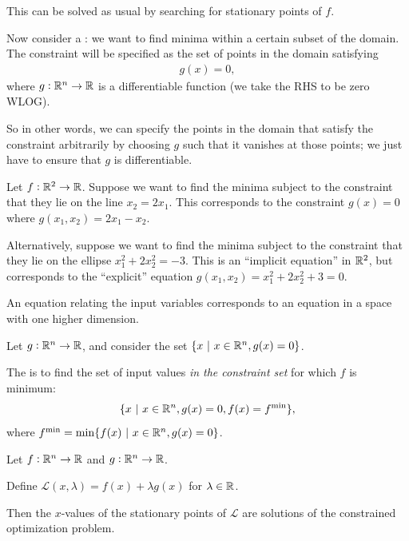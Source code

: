 This can be solved as usual by searching for stationary points of $f$.

Now consider a : we want to find minima within a certain
subset of the domain. The constraint will be specified as the set of points in the domain satisfying
\begin{align*}
  g(x) = 0,
\end{align*}
where $g:\mathbb{R}^n \to \mathbb{R}$ is a differentiable function (we take the RHS to be zero WLOG).

So in other words, we can specify the points in the domain that satisfy the constraint arbitrarily
by choosing $g$ such that it vanishes at those points; we just have to ensure that $g$ is differentiable.

\begin{example*}
  Let $f:\mathbb{R}^2 \to \mathbb{R}$. Suppose we want to find the minima subject to the constraint that they lie on the
  line $x_2 = 2x_1$. This corresponds to the constraint $g(x) = 0$ where $g(x_1, x_2) = 2x_1 - x_2$.

  Alternatively, suppose we want to find the minima subject to the constraint that they lie on the
  ellipse $x_1^2 + 2x_2^2 = -3$. This is an ``implicit equation'' in $\mathbb{R}^2$, but corresponds to the
  ``explicit'' equation $g(x_1, x_2) = x_1^2 + 2x_2^2 + 3 = 0$.
\end{example*}

An equation relating the input variables corresponds to an equation in a space with one higher dimension.




Let $g:\mathbb{R}^n \to \mathbb{R}$, and consider the set $\{ x ~|~ x \in \mathbb{R}^n, g(x) = 0 \}$.

\begin{definition*}
  The  is to find the set of input values \emph{in the constraint
    set} for which $f$ is minimum:
  \begin{align*}
    \{ x ~|~ x \in \mathbb{R}^n, g(x) = 0, f(x) = f^{\text{min}} \},
  \end{align*}
  where $f^{\text{min}} = \min \{f(x) ~|~ x \in \mathbb{R}^n, g(x) = 0\}$.
\end{definition*}


\begin{theorem*}
  Let $f: \mathbb{R}^n \to \mathbb{R}$ and $g:\mathbb{R}^n \to \mathbb{R}$.

  Define $\mathcal{L}(x, \lambda) = f(x) + \lambda g(x)$ for $\lambda \in \mathbb{R}$.

  Then the $x$-values of the stationary points of $\mathcal{L}$ are solutions of the constrained
  optimization problem.
\end{theorem*}

